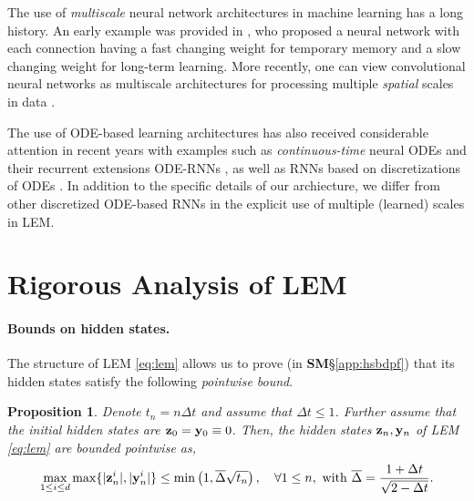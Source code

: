 \documentclass{article} \usepackage{iclr2022_conference,times}
\newcommand{\by}{{\bf y}}
\newcommand{\bz}{{\bf z}}
\newcommand{\Dt}{{\Delta t}}
\newcommand{\bdel}{\overline{\Delta}}
\newtheorem{proposition}[theorem]{Proposition}
\begin{document}
The use of \emph{multiscale} neural network architectures in machine learning has a long history. 
An early example was provided in \citet{HinPla}, who proposed a neural network with each connection having a fast changing weight for temporary memory and a slow changing weight for long-term learning. 
More recently, one can view convolutional neural networks as multiscale architectures for processing multiple \emph{spatial} scales in data \citep{Kolter}. 

The use of ODE-based learning architectures has also received considerable attention in recent years with examples such as \emph{continuous-time} neural ODEs \citep{neuralODE,continuousnet_TR,queiruga2021compressing} and their recurrent extensions ODE-RNNs \citep{ode_rnn}, as well as RNNs based on discretizations of ODEs \citep{anti,lip_rnn,srnn,lim2021noisy,coRNN,unicornn}. In addition to the specific details of our archiecture, we differ from other discretized ODE-based RNNs in the explicit use of multiple (learned) scales in LEM. 





\section{Rigorous Analysis of LEM}
\label{sec:rig}
\paragraph{Bounds on hidden states.} 
The structure of LEM \eqref{eq:lem} allows us to prove (in {\bf SM}\S\ref{app:hsbdpf}) that its hidden states satisfy the following \emph{pointwise bound}.
\begin{proposition}
\label{prop:1}
Denote $t_n = n \Dt$ and assume that $\Dt \leq  1$. Further assume that the initial hidden states are $\bz_0 = \by_0 \equiv 0$.
Then, the hidden states $\bz_n,\by_n$ of LEM \eqref{eq:lem} are bounded pointwise as,
\begin{equation}
    \label{eq:hsb}
    \max\limits_{1 \leq i \leq d} \max \{|\bz_n^i|, |\by_n^i|\} \leq \min\left(1,\bdel\sqrt{t_n}\right), \quad \forall 1\leq n, ~{\rm with}~\bdel = \frac{1+\Dt}{\sqrt{2-\Dt}}.
\end{equation}
\end{proposition}
\end{document}
